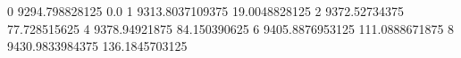 0 9294.798828125 0.0
1 9313.8037109375 19.0048828125
2 9372.52734375 77.728515625
4 9378.94921875 84.150390625
6 9405.8876953125 111.0888671875
8 9430.9833984375 136.1845703125
